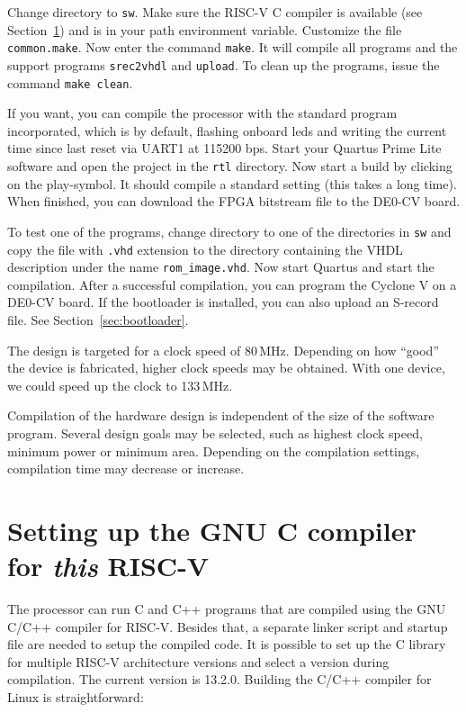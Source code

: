 \documentclass[12pt]{article}
\begin{document}
Change directory to \lstinline|sw|. Make sure the RISC-V C compiler is available (see Section~\ref{sec:ccompiler}) and is in your path environment variable. Customize the file \lstinline|common.make|. Now enter the command \lstinline|make|. It will compile all programs and the support programs \lstinline|srec2vhdl| and \lstinline|upload|. To clean up the programs, issue the command \lstinline|make clean|.

If you want, you can compile the processor with the standard program incorporated, which is by default, flashing onboard leds and writing the current time since last reset via UART1 at 115200 bps. Start your Quartus Prime Lite software and open the project in the \lstinline|rtl| directory. Now start a build by clicking on the play-symbol. It should compile a standard setting (this takes a long time). When finished, you can download the FPGA bitstream file to the DE0-CV board.

To test one of the programs, change directory to one of the directories in \lstinline|sw| and copy the file with \lstinline|.vhd| extension to the directory containing the VHDL description under the name \lstinline|rom_image.vhd|.
Now start Quartus and start the compilation. After a successful compilation, you can program the Cyclone V on a DE0-CV board. If the bootloader is installed, you can also upload an S-record file. See Section~\ref{sec:bootloader}.

The design is targeted for a clock speed of 80\,MHz. Depending on how ``good'' the device is fabricated, higher clock speeds may be obtained. With one device, we could speed up the clock to 133\,MHz.

Compilation of the hardware design is independent of the size of the software program. Several design goals may be selected, such as highest clock speed, minimum power or minimum area. Depending on the compilation settings, compilation time may decrease or increase.


\section{Setting up the GNU C compiler for \textit{this} RISC-V}
\label{sec:ccompiler}
The processor can run C and C++ programs that are compiled using the GNU C/C++ compiler for RISC-V. Besides that, a separate linker script and startup file are needed to setup the compiled code. It is possible to set up the C library for multiple RISC-V architecture versions and select a version during compilation. The current version is 13.2.0. Building the C/C++ compiler for Linux is straightforward:
\end{document}
